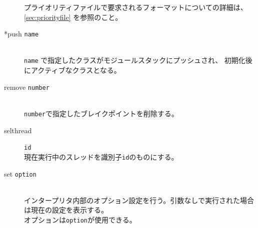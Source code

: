 \documentclass[\pformat,12pt]{jarticle}
\begin{document}
\begin{description}
  プライオリティファイルで要求されるフォーマットについての詳細は、\ref{sec:priorityfile} 
  を参照のこと。

\item[*push {\tt name}] \mbox{}\\
  {\tt name} で指定したクラスがモジュールスタックにプッシュされ、
  初期化後にアクティブなクラスとなる。

\item[remove \mbox{\texttt{number}}]
\mbox{}\\
  \texttt{number}で指定したブレイクポイントを削除する。

\item[selthread]\texttt{id}\mbox{}\\
  現在実行中のスレッドを識別子\texttt{id}のものにする。 

\item[set {\tt option} \ifthenelse{\boolean{VDMsl}}{\mbox{[{\tt argument}]}}{}]\mbox{}\\
  インタープリタ内部のオプション設定を行う。引数なしで実行された場合は現在の設定を表示する。\\
  オプションは{\tt option}\/が使用できる。
  

\end{description}
\end{document}
